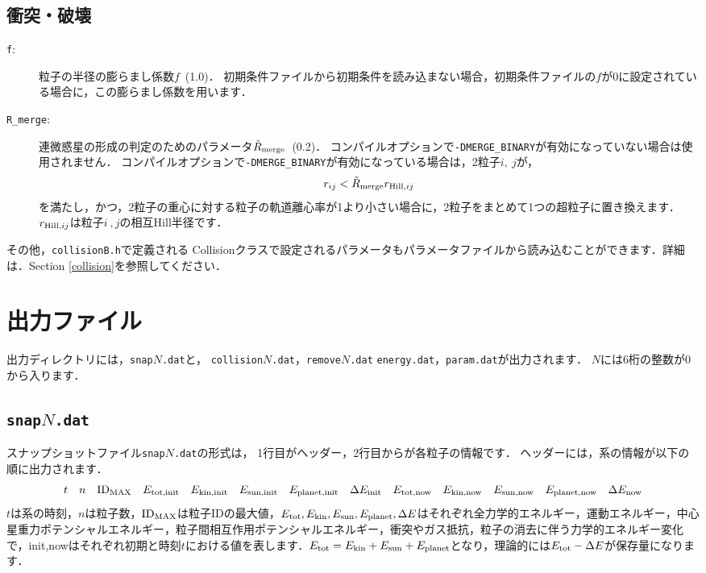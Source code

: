 \documentclass[12pt,a4paper,dvipdfmx]{jsarticle}
\begin{document}
\subsection{衝突・破壊}
\begin{description}
\item[\texttt{f}:]
粒子の半径の膨らまし係数$f$\ (1.0)．
初期条件ファイルから初期条件を読み込まない場合，初期条件ファイルの$f$が0に設定されている場合に，この膨らまし係数を用います．
\item[\texttt{R\_merge}:]
連微惑星の形成の判定のためのパラメータ$\tilde{R}_{\rm merge}$\ (0.2)．
コンパイルオプションで\texttt{-DMERGE\_BINARY}が有効になっていない場合は使用されません．
コンパイルオプションで\texttt{-DMERGE\_BINARY}が有効になっている場合は，2粒子$i,\ j$が，
\begin{equation}
r_{ij} < \tilde{R}_{\rm merge}r_{{\rm Hill},ij}
\end{equation}
を満たし，かつ，2粒子の重心に対する粒子の軌道離心率が1より小さい場合に，2粒子をまとめて1つの超粒子に置き換えます．
$r_{{\rm Hill},ij}$は粒子$i\ ,j$の相互Hill半径です．
\end{description}

その他，\texttt{collisionB.h}で定義される Collisionクラスで設定されるパラメータもパラメータファイルから読み込むことができます．詳細は．Section \ref{collision}を参照してください．


\section{出力ファイル\label{output}}

出力ディレクトリには，\texttt{snap}$N$\texttt{.dat}と，
\texttt{collision}$N$\texttt{.dat}，\texttt{remove}$N$\texttt{.dat}
\texttt{energy.dat}，\texttt{param.dat}が出力されます．
$N$には6桁の整数が0から入ります．

\subsection{\texttt{snap}$N$\texttt{.dat}\label{snap}}
スナップショットファイル\texttt{snap}$N$\texttt{.dat}の形式は，
1行目がヘッダー，2行目からが各粒子の情報です．
ヘッダーには，系の情報が以下の順に出力されます．
\[
t\quad n\quad {\rm ID}_{\rm MAX}\quad E_{\rm tot,init}\quad E_{\rm kin,init}\quad E_{\rm sun,init}\quad E_{\rm planet,init}\quad \Delta E_{\rm init}
\quad E_{\rm tot,now}\quad E_{\rm kin,now}\quad E_{\rm sun,now}\quad E_{\rm planet,now}\quad \Delta E_{\rm now}
\]
$t$は系の時刻，$n$は粒子数，${\rm ID}_{\rm MAX}$は粒子IDの最大値，$E_{\rm tot},E_{\rm kin},E_{\rm sun}, E_{\rm planet},\Delta E$はそれぞれ全力学的エネルギー，運動エネルギー，中心星重力ポテンシャルエネルギー，粒子間相互作用ポテンシャルエネルギー，衝突やガス抵抗，粒子の消去に伴う力学的エネルギー変化で，init,nowはそれぞれ初期と時刻$t$における値を表します．$E_{\rm tot} = E_{\rm kin} + E_{\rm sun} + E_{\rm planet}$となり，理論的には$E_{\rm tot}-\Delta E$が保存量になります．
\end{document}
